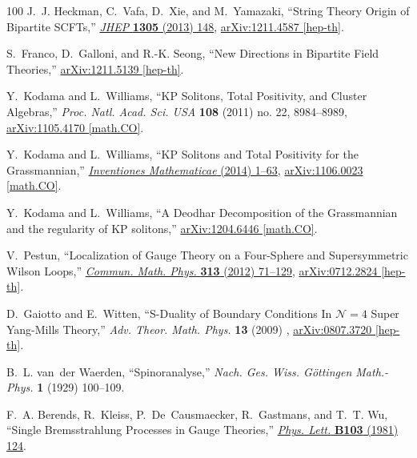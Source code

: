 \documentclass[12pt,hyperref,compress]{JHEP3}
\begin{document}
\begin{thebibliography}{100}
J.~J. Heckman, C.~Vafa, D.~Xie, and M.~Yamazaki, ``{String Theory Origin of
  Bipartite SCFTs},'' \href{http://dx.doi.org/10.1007/JHEP05(2013)148}{{\em
  JHEP} {\bf 1305} (2013)  148},
\href{http://arxiv.org/abs/1211.4587}{{ arXiv:1211.4587 [hep-th]}}.

S.~Franco, D.~Galloni, and R.-K. Seong, ``{New Directions in Bipartite Field
  Theories},''
\href{http://arxiv.org/abs/1211.5139}{{ arXiv:1211.5139 [hep-th]}}.

Y.~Kodama and L.~Williams, ``{KP Solitons, Total Positivity, and Cluster
  Algebras},'' {\em {Proc. Natl. Acad. Sci. USA}} {\bf 108} (2011) no. 22,
  8984--8989,
\href{http://arxiv.org/abs/1105.4170}{{ arXiv:1105.4170 [math.CO]}}.

Y.~Kodama and L.~Williams, ``{KP Solitons and Total Positivity for the
  Grassmannian},'' \href{http://dx.doi.org/10.1007/s00222-014-0506-3}{{\em
  {Inventiones Mathematicae}} (2014)  1--63},
\href{http://arxiv.org/abs/1106.0023}{{ arXiv:1106.0023 [math.CO]}}.

Y.~Kodama and L.~Williams, ``{A Deodhar Decomposition of the Grassmannian and
  the regularity of KP solitons},''
\href{http://arxiv.org/abs/1204.6446}{{ arXiv:1204.6446 [math.CO]}}.

V.~Pestun, ``{Localization of Gauge Theory on a Four-Sphere and Supersymmetric
  Wilson Loops},'' \href{http://dx.doi.org/10.1007/s00220-012-1485-0}{{\em
  Commun. Math. Phys.} {\bf 313} (2012)  71--129},
\href{http://arxiv.org/abs/0712.2824}{{ arXiv:0712.2824 [hep-th]}}.

D.~Gaiotto and E.~Witten, ``{S-Duality of Boundary Conditions In
  $\mathcal{N}\!=\!4$ Super Yang-Mills Theory},'' {\em Adv. Theor. Math. Phys.}
  {\bf 13} (2009)  ,
\href{http://arxiv.org/abs/0807.3720}{{ arXiv:0807.3720 [hep-th]}}.

B.~L. van~der Waerden, ``{Spinoranalyse},'' {\em Nach. Ges. Wiss. G\"{o}ttingen
  Math.-Phys.} {\bf 1} (1929)  100--109.

F.~A. Berends, R.~Kleiss, P.~De~Causmaecker, R.~Gastmans, and T.~T. Wu,
  ``{Single Bremsstrahlung Processes in Gauge Theories},''
\href{http://dx.doi.org/10.1016/0370-2693(81)90685-7}{{\em Phys. Lett.} {\bf
  B103} (1981)  124}.


\end{thebibliography}
\end{document}
